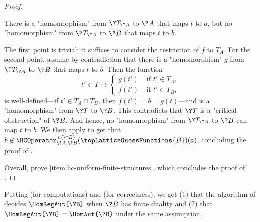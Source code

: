 \begin{proof}

	\begin{claim}
		\AP\label{claim:hyperedge-consistency-uniform-convergence-tree}
		There is a "homomorphism" from $\?T_{\?A}$ to $\?A$ that maps $t$ to $a$,
		but no "homomorphism" from $\?T_{\?A}$ to $\?B$ that maps $t$ to $b$.
	\end{claim}
	The first point is trivial: it suffices to consider the restriction of $f$ to $T_A$.
	For the second point, assume by contradiction that there is a "homomorphism" $g$ from
	$\?T_{\?A}$ to $\?B$ that maps $t$ to $b$.
	Then the function
	\[
		t' \in T \mapsto \begin{cases*}
			g(t') & \text{ if $t' \in T_A$,}\\
			f(t') & \text{ if $t' \in T_B$,}
		\end{cases*}
	\]
	is well-defined---if $t' \in T_A \cap T_B$, then $f(t') = b = g(t)$---and is a "homomorphism"
	from $\?T$ to $\?B$. This contradicts that $\?T$ is a "critical obstruction" of $\?B$.
	And hence, no "homomorphism" from $\?T_{\?A}$ to $\?B$ can map $t$ to $b$.
	We then apply 
	to get that $b \not\in \HCOperator^{\,n(\?B)}_{\?A,\?B}(\topLatticeGuessFunctions{B})(a)$,
	concluding the proof of .
	
	Overall,  prove 
	\eqref{item:hc-uniform-finite-structures}, which concludes the proof of .
\end{proof}

Putting 
(for computations) and 
(for correctness), we get (1) that the
algorithm of  decides $\HomRegAut{\?B}$
when $\?B$ has finite duality and (2) that $\HomRegAut{\?B} = \HomAut{\?B}$
under the same assumption.

